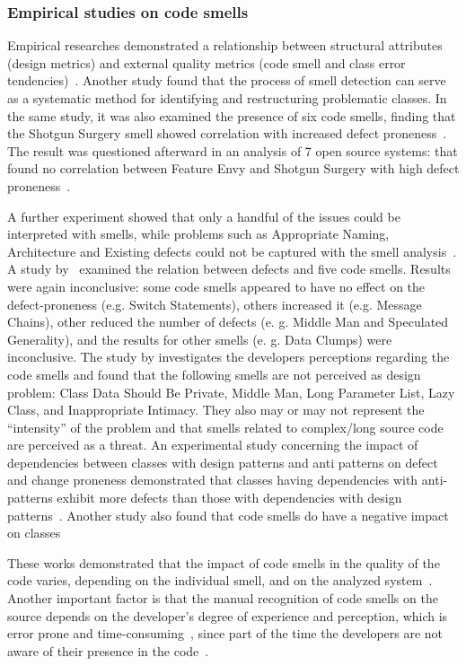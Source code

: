 \subsubsection{Empirical studies on code smells}
Empirical researches demonstrated a relationship between structural attributes (design metrics) and external quality metrics (code smell and class error tendencies)~\citep{shatnawi2008effectiveness}. Another study found that the process of smell detection can serve as a systematic method for identifying and restructuring problematic classes. In the same study, it was also examined the presence of six code smells, finding that the Shotgun Surgery smell showed correlation with increased defect proneness~\citep{li2007empirical}. The result was questioned afterward in an analysis of 7 open source systems: that found no correlation between Feature Envy and Shotgun Surgery with high defect proneness~\citep{dambros2010impact}. 

A further experiment showed that only a handful of the issues could be interpreted with smells, while problems such as Appropriate Naming, Architecture and Existing defects could not be captured with the smell analysis~\citep{yamashita2012code}. A study by~\cite{hall2014some} examined the relation between defects and five code smells. Results were again inconclusive: some code smells appeared to have no effect on the defect-proneness (e.g. Switch Statements), others increased it (e.g. Message Chains), other reduced the number of defects (e. g.  Middle Man and Speculated Generality), and the results for other smells (e. g. Data Clumps) were inconclusive. The study by \citet{palomba2014reallysmell} investigates the developers perceptions regarding the code smells and found that the following smells are not perceived as design problem: Class Data Should Be Private, Middle Man, Long Parameter List, Lazy Class, and Inappropriate Intimacy. They also may or may not represent the “intensity” of the problem and that smells related to complex/long source code are perceived as a threat. An experimental study concerning the impact of dependencies between classes with design patterns and anti patterns on defect and change proneness demonstrated that classes having dependencies with anti-patterns exhibit more defects than those with dependencies with design patterns~\citep{jaafar2016evaluating}. Another study also found that code smells do have a negative impact on classes~\citep{khomh2009exploratory}

These works demonstrated that the impact of code smells in the quality of the code varies, depending on the individual smell, and on the analyzed system~\citep{walter2016relationship}. Another important factor is that the manual recognition of code smells on the source depends on the developer’s degree of experience and perception, which is error prone and time-consuming~\citep{counsell2010strategy}, since part of the time the developers are not aware of their presence in the code~\citep{yamashita2013developers}.

